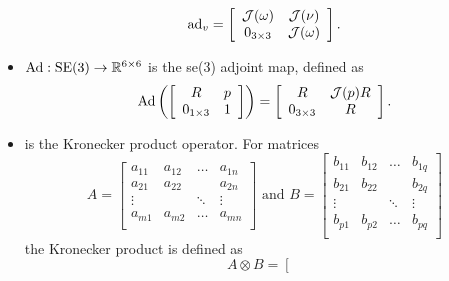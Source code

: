\begin{itemize}
\begin{equation}
\label{chModels.eq.ad}
\operatorname{ad}_v=
\left[ \begin{array}{cc}
     \mathcal{J}(\omega) &  \mathcal{J}(\nu)        \\
      0_{3 \times 3}     & \mathcal{J}(\omega)    \\
\end{array} \right].
\end{equation}
%
%
\item $\Ad:\SE3\to\mathbb{R}^{6\times 6}$ is the se(3) adjoint map,  defined as
%
\begin{equation}
\label{chModels.eq.Ad}
\operatorname{Ad}\left(
\left[ \begin{array}{cc} 
R &  p \\ 
0_{1\times 3} &  1 \\
\end{array} \right]\right) =
\left[ \begin{array}{cc}
             R           & \mathcal{J}(p) R   \\
      0_{3 \times 3}        &    R  \\
\end{array} \right].
\end{equation}
%
%
\item {}
is the Kronecker product operator\cite{kron}.  
%
For matrices 
%
\begin{equation}
A=\left[ \begin{array}{cccc} 
a_{11} & a_{12} &\hdots & a_{1n}  \\
a_{21} & a_{22} &       & a_{2n}  \\
\vdots &      &\ddots & \vdots \\
a_{m1} & a_{m2} &\hdots & a_{mn}  \\
\end{array} \right]
%
\text{ and }
%
B=\left[ \begin{array}{cccc} 
b_{11} & b_{12} &\hdots & b_{1q}  \\
b_{21} & b_{22} &       & b_{2q}  \\
\vdots &      &\ddots & \vdots \\
b_{p1} & b_{p2} &\hdots & b_{pq}  \\
\end{array} \right]
\end{equation}
%
the Kronecker product is defined as
%
\vspace{5mm}
\begin{equation}
A\otimes B=\left[ \begin{array}{cccc} 

\end{array}
\end{equation}
\end{itemize}
